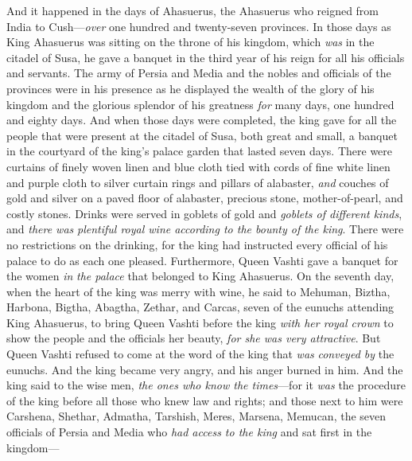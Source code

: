 
\begin{biblechapter} %
 And it happened in the days of Ahasuerus, the Ahasuerus who reigned from India to Cush—\textit{over} one hundred and twenty-seven provinces.
\verse In those days as King Ahasuerus was sitting on the throne of his kingdom, which \textit{was} in the citadel of Susa,
\verse he gave a banquet in the third year of his reign for all his officials and servants. The army of Persia and Media and the nobles and officials of the provinces were in his presence
\verse as he displayed the wealth of the glory of his kingdom and the glorious splendor of his greatness \textit{for} many days, one hundred and eighty days.
\verse And when those days were completed, the king gave for all the people that were present at the citadel of Susa, both great and small, a banquet in the courtyard of the king’s palace garden that lasted seven days.
\verse There were curtains of finely woven linen and blue cloth tied with cords of fine white linen and purple cloth to silver curtain rings and pillars of alabaster, \textit{and} couches of gold and silver on a paved floor of alabaster, precious stone, mother-of-pearl, and costly stones.
\verse Drinks were served in goblets of gold and \textit{goblets of different kinds}, and \textit{there was} \textit{plentiful royal wine according to the bounty of the king}.
\verse There were no restrictions on the drinking, for the king had instructed every official of his palace to do as each one pleased.
\verse Furthermore, Queen Vashti gave a banquet for the women \textit{in} \textit{the palace} that belonged to King Ahasuerus.
 On the seventh day, when the heart of the king was merry with wine, he said to Mehuman, Biztha, Harbona, Bigtha, Abagtha, Zethar, and Carcas, seven of the eunuchs attending King Ahasuerus,
\verse to bring Queen Vashti before the king \textit{with her royal crown} to show the people and the officials her beauty, \textit{for she was very attractive}.
\verse But Queen Vashti refused to come at the word of the king that \textit{was} \textit{conveyed by} the eunuchs. And the king became very angry, and his anger burned in him.
\verse And the king said to the wise men, \textit{the ones who know the times}—for it \textit{was} the procedure of the king before all those who knew law and rights;
\verse and those next to him were Carshena, Shethar, Admatha, Tarshish, Meres, Marsena, Memucan, the seven officials of Persia and Media who \textit{had access to the king} and sat first in the kingdom—

\end{biblechapter}
